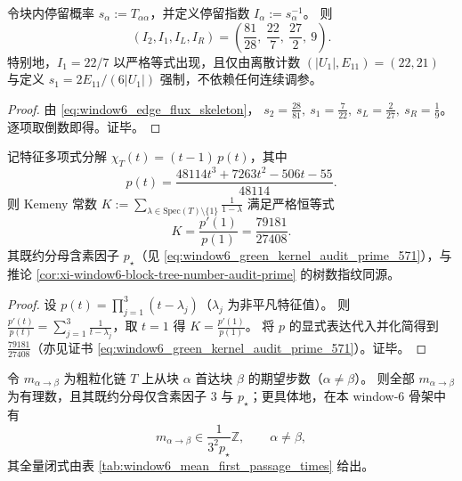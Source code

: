 

\begin{proposition}\label{prop:xi-window6-stay-indices-22-7}
令块内停留概率 \(s_\alpha:=T_{\alpha\alpha}\)，并定义停留指数 \(I_\alpha:=s_\alpha^{-1}\)。
则
\[
(I_2,I_1,I_L,I_R)=\left(\frac{81}{28},\ \frac{22}{7},\ \frac{27}{2},\ 9\right).
\]
特别地，\(I_1=22/7\) 以严格等式出现，且仅由离散计数 \((|U_1|,E_{11})=(22,21)\) 与定义 \(s_1=2E_{11}/(6|U_1|)\) 强制，不依赖任何连续调参。
\end{proposition}

\begin{proof}
由 \eqref{eq:window6_edge_flux_skeleton}，
\(
s_2=\frac{28}{81},\ s_1=\frac{7}{22},\ s_L=\frac{2}{27},\ s_R=\frac{1}{9}
\)。
逐项取倒数即得。证毕。
\end{proof}

\begin{proposition}\label{prop:xi-window6-kemeny-constant-rational}
记特征多项式分解 \(\chi_T(t)=(t-1)\,p(t)\)，其中
\[
p(t)=\frac{48114t^{3}+7263t^{2}-506t-55}{48114}.
\]
则 Kemeny 常数
\(
K:=\sum_{\lambda\in\mathrm{Spec}(T)\setminus\{1\}}\frac{1}{1-\lambda}
\)
满足严格恒等式
\[
K=\frac{p'(1)}{p(1)}=\frac{79181}{27408}.
\]
其既约分母含素因子 \(p_\star\)（见 \eqref{eq:window6_green_kernel_audit_prime_571}），与推论 \ref{cor:xi-window6-block-tree-number-audit-prime} 的树数指纹同源。
\end{proposition}

\begin{proof}
设 \(p(t)=\prod_{j=1}^{3}(t-\lambda_j)\)（\(\lambda_j\) 为非平凡特征值）。
则 \(\frac{p'(t)}{p(t)}=\sum_{j=1}^{3}\frac{1}{t-\lambda_j}\)，取 \(t=1\) 得 \(K=\frac{p'(1)}{p(1)}\)。
将 \(p\) 的显式表达代入并化简得到 \(\frac{79181}{27408}\)（亦见证书 \eqref{eq:window6_green_kernel_audit_prime_571}）。证毕。
\end{proof}

\begin{corollary}\label{cor:xi-window6-mean-first-passage-denominator-quantization}
令 \(m_{\alpha\to\beta}\) 为粗粒化链 \(T\) 上从块 \(\alpha\) 首达块 \(\beta\) 的期望步数（\(\alpha\neq\beta\)）。
则全部 \(m_{\alpha\to\beta}\) 为有理数，且其既约分母仅含素因子 \(3\) 与 \(p_\star\)；更具体地，在本 window-\(6\) 骨架中有
\[
m_{\alpha\to\beta}\in \frac{1}{3^{2}p_\star}\mathbb Z,\qquad \alpha\neq\beta,
\]
其全量闭式由表 \ref{tab:window6_mean_first_passage_times} 给出。
\end{corollary}

